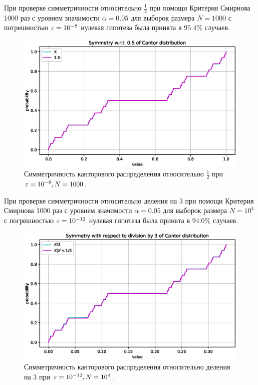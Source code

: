 \documentclass[11pt]{report}
\begin{document}
При проверке симметричности относительно $\frac{1}{2}$ при помощи Критерия Смирнова 1000 раз с уровнем значимости $\alpha=0.05$ для выборок размера $N=1000$ с погрешностью $\varepsilon=10^{-8}$ нулевая гипотеза была принята в $95.4\%$ случаев.

\begin{figure}[H]
    \centering
    \includegraphics[width=0.9\linewidth]{kantor-symm-half.eps}
    \caption{Симметричность канторового распределения относительно $\frac{1}{2}$ при $\varepsilon=10^{-8},N=1000$.}
    \label{fig:kantor-symm-half}
\end{figure}

При проверке симметричности относительно деления на 3 при помощи Критерия Смирнова 1000 раз с уровнем значимости $\alpha=0.05$ для выборок размера $N=10^4$ с погрешностью $\varepsilon=10^{-12}$ нулевая гипотеза была принята в $94.0\%$ случаев.

\begin{figure}[H]
    \centering
    \includegraphics[width=0.9\linewidth]{kantor-symm-division.eps}
    \caption{Симметричность канторового распределения относительно деления на 3 при $\varepsilon=10^{-12},N=10^4$.}
    \label{fig:kantor-symm-division}
\end{figure}
\end{document}
